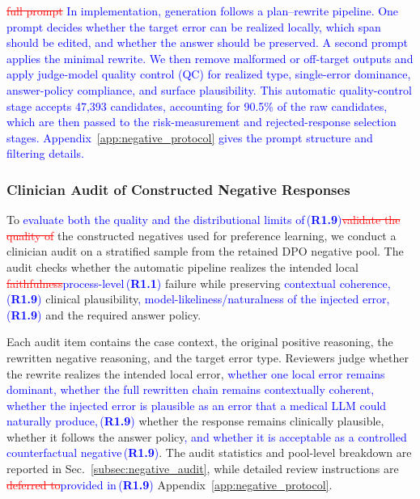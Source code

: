 \documentclass[a4paper,fleqn,doubleblind]{cas-sc}
\DeclareRobustCommand{\deleted}[1]{\textcolor{red}{\sout{#1}}}
\DeclareRobustCommand{\added}[1]{\textcolor{blue}{#1}}
\DeclareRobustCommand{\revtag}[1]{\textcolor{blue}{\scriptsize\,(\textbf{#1})}}
\begin{document}
\deleted{full prompt}
\added{In implementation, generation follows a plan--rewrite pipeline. One prompt decides whether the target error can be realized locally, which span should be edited, and whether the answer should be preserved. A second prompt applies the minimal rewrite. We then remove malformed or off-target outputs and apply judge-model quality control (QC) for realized type, single-error dominance, answer-policy compliance, and surface plausibility. This automatic quality-control stage accepts 47,393 candidates, accounting for 90.5\% of the raw candidates, which are then passed to the risk-measurement and rejected-response selection stages. Appendix~\ref{app:negative_protocol} gives the prompt structure and filtering details.}

\subsubsection{Clinician Audit of Constructed Negative Responses}

To \added{evaluate both the quality and the distributional limits of}\revtag{R1.9}\deleted{validate the quality of} the constructed negatives used for preference learning, we conduct a clinician audit on a stratified sample from the retained DPO negative pool. The audit checks whether the automatic pipeline realizes the intended local \deleted{faithfulness}\added{process-level}\revtag{R1.1} failure while preserving \added{contextual coherence,}\revtag{R1.9} clinical plausibility\added{, model-likeliness/naturalness of the injected error,}\revtag{R1.9} and the required answer policy.

Each audit item contains the case context, the original positive reasoning, the rewritten negative reasoning, and the target error type. Reviewers judge whether the rewrite realizes the intended local error, \added{whether one local error remains dominant, whether the full rewritten chain remains contextually coherent, whether the injected error is plausible as an error that a medical LLM could naturally produce,}\revtag{R1.9} whether the response remains clinically plausible, whether it follows the answer policy\added{, and whether it is acceptable as a controlled counterfactual negative}\revtag{R1.9}. The audit statistics and pool-level breakdown are reported in Sec.~\ref{subsec:negative_audit}, while detailed review instructions are \deleted{deferred to}\added{provided in}\revtag{R1.9} Appendix~\ref{app:negative_protocol}.
\end{document}
